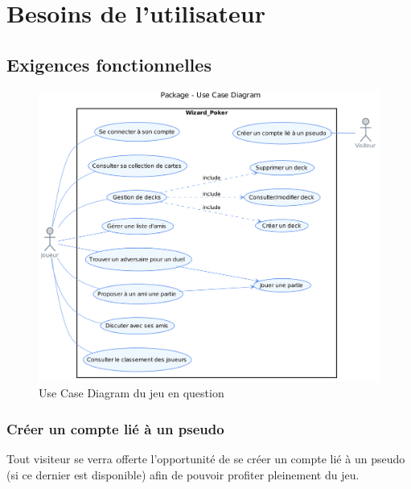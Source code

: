 \documentclass[11pt,a4paper]{article}
\begin{document}
\section{Besoins de l'utilisateur}
\label{sec:besoins}


\subsection{Exigences fonctionnelles}
\label{sec:exi-fonc}
  \begin{figure}[ht]
    \centering
    \includegraphics[width=1\textwidth]{uml_files/UseCaseDiagram.png}
    \caption{\label{fig:usecase} Use Case Diagram du jeu en question}
  \end{figure}
  
  \subsubsection{Créer un compte lié à un pseudo}
    Tout visiteur se verra offerte l'opportunité de se créer un compte lié à un pseudo (si ce dernier est disponible) afin de pouvoir profiter pleinement du jeu.
\end{document}
